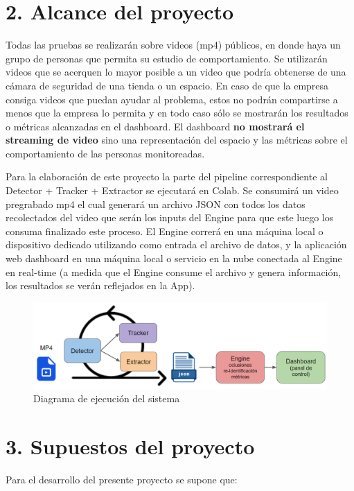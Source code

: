 \documentclass[11pt]{charter}
\begin{document}
\section{2. Alcance del proyecto}
\label{sec:alcance}
Todas las pruebas se realizarán sobre videos (mp4) públicos, en donde haya un grupo de personas que permita su estudio de comportamiento. Se utilizarán videos que se acerquen lo mayor posible a un video que podría obtenerse de una cámara de seguridad de una tienda o un espacio. En caso de que la empresa consiga videos que puedan ayudar al problema, estos no podrán compartirse a menos que la empresa lo permita y en todo caso sólo se mostrarán los resultados o métricas alcanzadas en el dashboard. El dashboard \textbf{no mostrará el streaming de video} sino una representación del espacio y las métricas sobre el comportamiento de las personas monitoreadas.

Para la elaboración de este proyecto la parte del pipeline correspondiente al Detector + Tracker + Extractor se ejecutará en Colab. Se consumirá un video pregrabado mp4 el cual generará un archivo JSON con todos los datos recolectados del video que serán los inputs del Engine para que este luego los consuma finalizado este proceso. El Engine correrá en una máquina local o dispositivo dedicado utilizando como entrada el archivo de datos, y la aplicación web dashboard  en una máquina local o servicio en la nube conectada al Engine en real-time (a medida que el Engine consume el archivo y genera información, los resultados se verán reflejados en la App).

\begin{figure}[htpb]
\centering 
\includegraphics[width=.7\textwidth]{./Figuras/diagEjecucion.png}
\caption{Diagrama de ejecución del sistema}
\label{fig:diagEjecucion}
\end{figure}

\newpage

\section{3. Supuestos del proyecto}
\label{sec:supuestos}

Para el desarrollo del presente proyecto se supone que:
\end{document}
